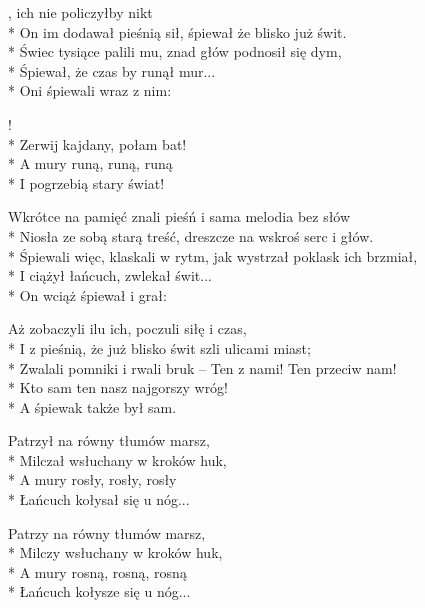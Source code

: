 
\begin{lyrics}[longestline={Śpiewali więc, klaskali w rytm, jak wystrzał poklask ich brzmiał,}]

, ich nie policzyłby nikt\\*
On im dodawał pieśnią sił, śpiewał że blisko już świt.\\*
Świec tysiące palili mu, znad głów podnosił się dym,\\*
Śpiewał, że czas by runął mur...\\*
Oni śpiewali wraz z nim:

\begin{chorus}
!\\*
Zerwij kajdany, połam bat!\\*
A mury runą, runą, runą\\*
I pogrzebią stary świat!
\end{chorus}

Wkrótce na pamięć znali pieśń i sama melodia bez słów\\*
Niosła ze sobą starą treść, dreszcze na wskroś serc i głów.\\*
Śpiewali więc, klaskali w rytm, jak wystrzał poklask ich brzmiał,\\*
I ciążył łańcuch, zwlekał świt...\\*
On wciąż śpiewał i grał:

\chorusref

Aż zobaczyli ilu ich, poczuli siłę i czas,\\*
I z pieśnią, że już blisko świt szli ulicami miast;\\*
Zwalali pomniki i rwali bruk -- Ten z nami! Ten przeciw nam!\\*
Kto sam ten nasz najgorszy wróg!\\*
A śpiewak także był sam.

Patrzył na równy tłumów marsz,\\*
Milczał wsłuchany w kroków huk,\\*
A mury rosły, rosły, rosły\\*
Łańcuch kołysał się u nóg...

Patrzy na równy tłumów marsz,\\*
Milczy wsłuchany w kroków huk,\\*
A mury rosną, rosną, rosną\\*
Łańcuch kołysze się u nóg...
\end{lyrics}



